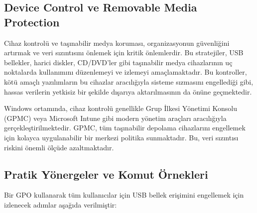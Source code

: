 \subsection{Device Control ve Removable Media Protection}

Cihaz kontrolü ve taşınabilir medya koruması, organizasyonun güvenliğini artırmak ve veri sızıntısını önlemek için kritik önlemlerdir. Bu stratejiler, USB bellekler, harici diskler, CD/DVD'ler gibi taşınabilir medya cihazlarının uç noktalarda kullanımını düzenlemeyi ve izlemeyi amaçlamaktadır. Bu kontroller, kötü amaçlı yazılımların bu cihazlar aracılığıyla sisteme sızmasını engellediği gibi, hassas verilerin yetkisiz bir şekilde dışarıya aktarılmasının da önüne geçmektedir.

Windows ortamında, cihaz kontrolü genellikle Grup İlkesi Yönetimi Konsolu (GPMC) veya Microsoft Intune gibi modern yönetim araçları aracılığıyla gerçekleştirilmektedir. GPMC, tüm taşınabilir depolama cihazlarını engellemek için kolayca uygulanabilir bir merkezi politika sunmaktadır. Bu, veri sızıntısı riskini önemli ölçüde azaltmaktadır.

\subsection{Pratik Yönergeler ve Komut Örnekleri}

Bir GPO kullanarak tüm kullanıcılar için USB bellek erişimini engellemek için izlenecek adımlar aşağıda verilmiştir:

